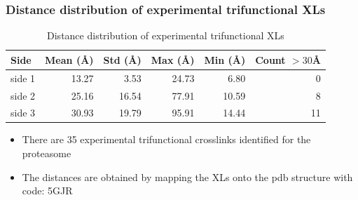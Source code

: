 \documentclass[a4paper,8pt]{beamer}
\begin{document}
\begin{frame}
  \frametitle{Distance distribution of experimental trifunctional XLs}
  \centering
  \begin{table}
    \centering
    \caption{Distance distribution of experimental trifunctional XLs}
  \begin{tabular}{lrrrrr}
    \toprule
    Side & Mean ({\AA}) & Std ({\AA}) & Max ({\AA}) & Min ({\AA}) & Count $> 30${\AA} \\
    \midrule
    side 1 & 13.27 & 3.53 & 24.73 & 6.80 & 0 \\
    side 2 & 25.16 & 16.54 & 77.91 & 10.59 & 8 \\
    side 3 & 30.93 & 19.79 & 95.91 & 14.44 & 11 \\
    \bottomrule
    \end{tabular}   
  \end{table} 
  \begin{block}
    {}
    \begin{itemize}
      \item There are 35 experimental trifunctional crosslinks identified for the proteasome
      \item The distances are obtained by mapping the XLs onto the pdb structure with code: 5GJR
    \end{itemize}
    \end{block}
\end{frame}
\end{document}
